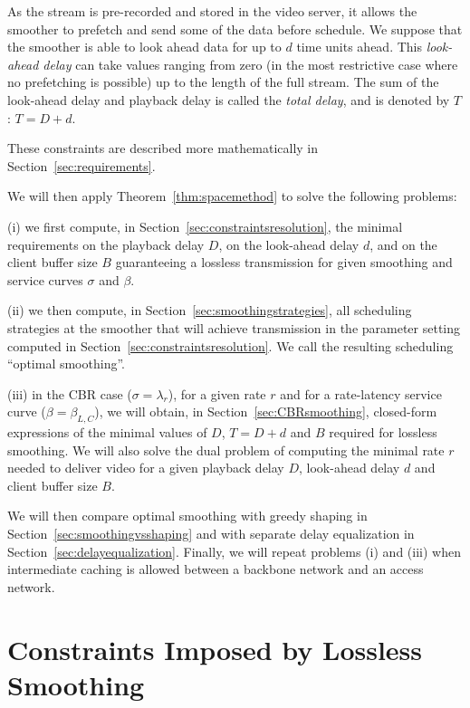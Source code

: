 As the stream is pre-recorded and stored in the video server, it allows the smoother to prefetch and send some of the data
before schedule. We suppose that the smoother is able to look ahead data for up to $d$ time units ahead.
This {\em look-ahead delay} can take values ranging from zero (in the most restrictive case
where no prefetching is possible) up to the length of the full stream. The sum of the look-ahead delay and
playback delay is called the {\em total delay}, and is denoted by $T$: $T = D + d$.

These constraints are described more mathematically in Section~\ref{sec:requirements}.

We will then apply Theorem~\ref{thm:spacemethod} to solve the following problems:

\vspace{1ex}
\noindent
(i) we first compute, in Section~\ref{sec:constraintsresolution}, the minimal requirements on the playback delay $D$, on the look-ahead delay $d$, and on the client buffer size $B$ guaranteeing a lossless transmission for given smoothing and service curves $\sigma$ and $\beta$.

\vspace{1ex}
\noindent
(ii) we then compute, in Section~\ref{sec:smoothingstrategies}, all scheduling strategies at the smoother that will achieve transmission in the parameter setting computed in Section~\ref{sec:constraintsresolution}. We call the resulting scheduling ``optimal smoothing''.

\vspace{1ex}
\noindent
(iii) in the CBR case ($\sigma = \lambda_r$), for a given rate $r$ and for a rate-latency service curve ($\beta=\beta_{L,C}$), we will obtain, in Section~\ref{sec:CBRsmoothing}, closed-form expressions of the minimal values of $D$, $T=D+d$ and $B$ required for lossless smoothing. We will also solve the dual problem of computing the minimal rate $r$ needed to deliver video for a given playback delay $D$,  look-ahead delay $d$ and client buffer size $B$.

\vspace{1ex}
We will then compare optimal smoothing with greedy shaping in Section~\ref{sec:smoothingvsshaping} and with separate delay equalization in Section~\ref{sec:delayequalization}. Finally, we will repeat problems (i) and (iii) when intermediate caching is allowed between a backbone network and an access network.

\section{Constraints Imposed by Lossless Smoothing}


